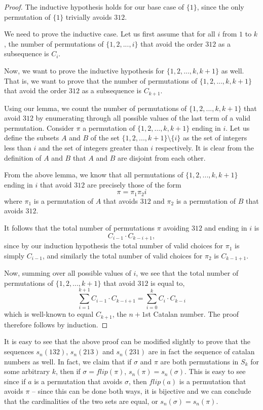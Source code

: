 \documentclass[11pt,letterpaper,twoside,english]{article}
\theoremstyle{theorem}
\theoremstyle{remark}
\begin{document}
\begin{proof}
The inductive hypothesis holds for our base case of $\{1\}$, since the only permutation of $\{1\}$ trivially avoids $312$.

We need to prove the inductive case. Let us first assume that for all $i$ from $1$ to $k$, the number of permutations of $\{1,2,...,i\}$ that avoid the order $312$ as a subsequence is $C_i$.

Now, we want to prove the inductive hypothesis for $\{1,2,...,k,k+1\}$ as well. That is, we want to prove that the number of permutations of $\{1,2,...,k,k+1\}$ that avoid the order $312$ as a subsequence is $C_{k+1}$.

Using our lemma, we count the number of permutations of $\{1,2,...,k,k+1\}$ that avoid $312$ by enumerating through all possible values of the last term of a valid permutation. Consider $\pi$ a permutation of $\{1,2,\ldots, k, k+1\}$ ending in $i$. Let us define the subsets $A$ and $B$ of the  set $\{1,2,...,k+1\} \setminus \{i\}$ as the set of integers less than $i$ and the set of integers greater than $i$ respectively. It is clear from the definition of $A$ and $B$ that $A$ and $B$ are disjoint from each other.

From the above lemma, we know that all permutations of $\{1,2,...,k,k+1\}$ ending in $i$ that avoid $312$ are precisely those of the form
$$\pi = \pi_1 \pi_2 i$$
where $\pi_1$ is a permutation of $A$ that avoids $312$ and $\pi_2$ is a permutation of $B$ that avoids $312$.

It follows that the total number of permutations $\pi$ avoiding $312$ and ending in $i$ is
$$C_{i-1} \cdot C_{k-i+1},$$
since by our induction hypothesis the total number of valid choices for $\pi_1$ is simply $C_{i-1}$, and similarly the total number of valid choices for $\pi_2$ is $C_{k-1+1}$.

Now, summing over all possible values of $i$, we see that the total number of permutations of $\{1,2,...,k+1\}$ that avoid $312$ is equal to,
$$\sum_{i=1}^{k+1} C_{i-1} \cdot C_{k-i+1} = \sum_{i=0}^k C_i \cdot C_{k-i}$$ which is well-known to equal $C_{k+1}$, the $n+1$st Catalan number. The proof  therefore follows by induction.

\end{proof}

It is easy to see that the above proof can be modified slightly to prove that the sequences $s_n(132)$, $s_n(213)$ and $s_n(231)$ are in fact the sequence of catalan numbers as well. In fact, we claim that if $\sigma$ and $\pi$ are both permutations in $S_k$ for some arbitrary $k$, then if $\sigma = flip(\pi)$, $s_n(\pi) = s_n(\sigma)$. This is easy to see since if $a$ is a permutation that avoids $\sigma$, then $flip(a)$ is a permutation that avoids $\pi$ -- since this can be done both ways, it is bijective and we can conclude that the cardinalities of the two sets are equal, or $s_n(\sigma) = s_n(\pi)$.
\end{document}
